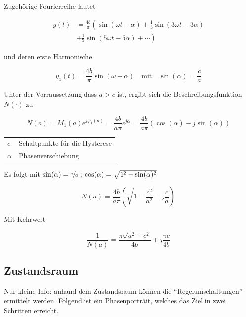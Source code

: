 \documentclass[
  10pt,
  a4paper,
  twocolumn]{article}
\makeatletter
\numberwithin{equation}{section}
\newenvironment{conditions}
  {\par\vspace{\abovedisplayskip}\noindent\begin{tabular}{>{$}l<{$} @{${}:{}$} l}}
  {\end{tabular}\par\vspace{\belowdisplayskip}}
\makeatother
\begin{document}
Zugehörige Fourierreihe lautet

\[
\begin{split}
y(t) &= \frac{4b}{\pi}\left(\sin(\omega t-\alpha) + \frac1{3}\sin(3\omega t-3\alpha)\right. \\
     &+ \left.\frac1{3}\sin(5\omega t-5\alpha)+\cdots\right)
\end{split}
\]

und deren erste Harmonische

\[
y_1(t)=\frac{4b}{\pi}\sin(\omega-\alpha)\quad\text{mit}\quad \sin(\alpha)=\frac{c}{a}
\]

Unter der Vorraussetzung dass \(a > c\) ist, ergibt sich die
Beschreibungsfunktion \(N(\cdot)\) zu

\[
N(a)= M_1(a)e^{j\varphi_1(a)}=\frac{4b}{a\pi}e^{j\alpha}=\frac{4b}{a\pi}(\cos(\alpha)-j\sin(\alpha))
\]

\begin{conditions}
  c & Schaltpunkte für die Hysterese \\
  \alpha & Phasenverschiebung
\end{conditions}

Es folgt mit
\(\sin(\alpha)=\sfrac{c}{a}\;;\; \cos(\alpha)=\sqrt{1^2-\sin(\alpha)^2}\)

\[
N(a)=\frac{4b}{a\pi}\left(\sqrt{1-\frac{c^2}{a^2}}-j\frac{c}{a}\right)
\]

Mit Kehrwert

\[
\frac1{N(a)}=\frac{\pi \sqrt{a^2-c^2}}{4b}+j\frac{\pi c}{4b}
\]

\hypertarget{zustandsraum}{%
\subsection{Zustandsraum}\label{zustandsraum}}

Nur kleine Info: anhand dem Zustandsraum können die
``Regelumschaltungen'' ermittelt werden. Folgend ist ein Phasenporträit,
welches das Ziel in zwei Schritten erreicht.
\end{document}
